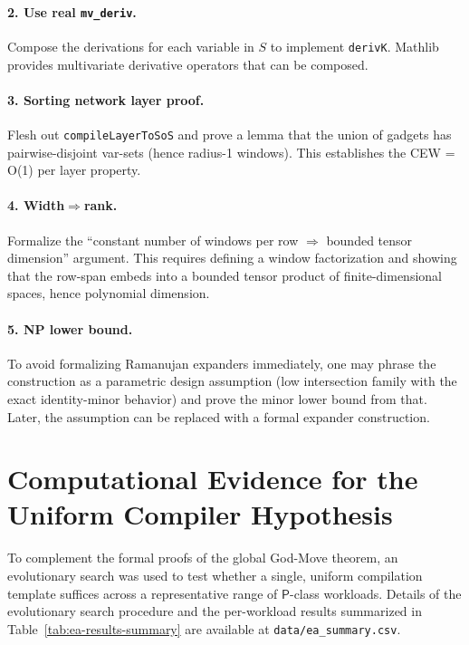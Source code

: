 \documentclass[12pt]{article}
\theoremstyle{definition}
\theoremstyle{definition}
\theoremstyle{remark}
\theoremstyle{remark}
\begin{document}
\paragraph{2. Use real \texttt{mv\_deriv}.}
Compose the derivations for each variable in $S$ to implement \texttt{derivK}. Mathlib provides multivariate derivative operators that can be composed.

\paragraph{3. Sorting network layer proof.}
Flesh out \texttt{compileLayerToSoS} and prove a lemma that the union of gadgets has pairwise-disjoint var-sets (hence radius-1 windows). This establishes the CEW = O(1) per layer property.

\paragraph{4. Width$\Rightarrow$rank.}
Formalize the ``constant number of windows per row $\Rightarrow$ bounded tensor dimension'' argument. This requires defining a window factorization and showing that the row-span embeds into a bounded tensor product of finite-dimensional spaces, hence polynomial dimension.

\paragraph{5. NP lower bound.}
To avoid formalizing Ramanujan expanders immediately, one may phrase the construction as a parametric design assumption (low intersection family with the exact identity-minor behavior) and prove the minor lower bound from that. Later, the assumption can be replaced with a formal expander construction.



\section{Computational Evidence for the Uniform Compiler Hypothesis}
\label{sec:ea-evidence}

To complement the formal proofs of the global God-Move theorem, an evolutionary search was used to test whether a single, uniform compilation template suffices across a representative range of $\mathsf{P}$-class workloads. Details of the evolutionary search procedure and the per-workload results summarized in Table~\ref{tab:ea-results-summary} are available at \texttt{data/ea\_summary.csv}.
\end{document}
